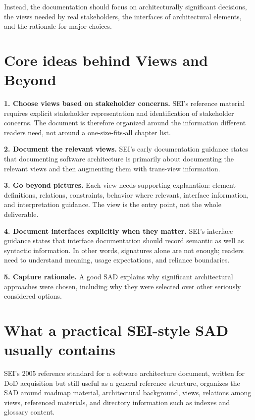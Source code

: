 \documentclass[11pt]{article}
\begin{document}
Instead, the documentation should focus on architecturally significant decisions, the views needed by real stakeholders, the interfaces of architectural elements, and the rationale for major choices.\cite{sei-ref-standard,sei-interfaces}

\section*{Core ideas behind Views and Beyond}

\textbf{1. Choose views based on stakeholder concerns.} SEI's reference material requires explicit stakeholder representation and identification of stakeholder concerns. The document is therefore organized around the information different readers need, not around a one-size-fits-all chapter list.\cite{sei-ref-standard}

\textbf{2. Document the relevant views.} SEI's early documentation guidance states that documenting software architecture is primarily about documenting the relevant views and then augmenting them with trans-view information.\cite{sei-layers}

\textbf{3. Go beyond pictures.} Each view needs supporting explanation: element definitions, relations, constraints, behavior where relevant, interface information, and interpretation guidance. The view is the entry point, not the whole deliverable.\cite{sei-vb-factsheet,sei-interfaces}

\textbf{4. Document interfaces explicitly when they matter.} SEI's interface guidance states that interface documentation should record semantic as well as syntactic information. In other words, signatures alone are not enough; readers need to understand meaning, usage expectations, and reliance boundaries.\cite{sei-interfaces}

\textbf{5. Capture rationale.} A good SAD explains why significant architectural approaches were chosen, including why they were selected over other seriously considered options.\cite{sei-ref-standard}

\section*{What a practical SEI-style SAD usually contains}

SEI's 2005 reference standard for a software architecture document, written for DoD acquisition but still useful as a general reference structure, organizes the SAD around roadmap material, architectural background, views, relations among views, referenced materials, and directory information such as indexes and glossary content.\cite{sei-ref-standard}
\end{document}
